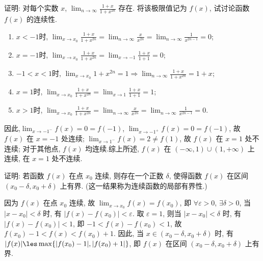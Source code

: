 \begin{exercise}[2.1.9]
    证明: 对每个实数 $x$, $\lim_{n \to \infty} \frac{1+x}{1+x^{2n}}$ 存在. 将该极限值记为 $f(x)$, 试讨论函数 $f(x)$ 的连续性.
\end{exercise}

\begin{solution}
    \begin{enumerate}[(\alph*).]
        \item $x < -1$时, $\lim_{x \to x_0} \frac{1+x}{1+x^{2n}} = \lim_{n \to \infty} \frac{x}{x^{2n}} = \lim_{n \to \infty} \frac{1}{x^{2n-1}} = 0$;
        \item $x = -1$时, $\lim_{x \to x_0} \frac{1+x}{1+x^{2n}} = \lim_{x \to -1} \frac{1+x}{1+1} = 0$;
        \item $-1 < x < 1$时, $\lim_{x \to x_0} 1 + x^{2n} = 1 \Rightarrow \lim_{n \to \infty} \frac{1+x}{1+x^{2n}} = 1 + x$;
        \item $x = 1$时, $\lim_{x \to x_0} \frac{1+x}{1+x^{2n}} = \lim_{x \to 1} \frac{1+x}{1+1} = 1$;
        \item $x > 1$时, $\lim_{x \to x_0} \frac{1+x}{1+x^{2n}} = \lim_{n \to \infty} \frac{x}{x^{2n}} = \lim_{n \to \infty} \frac{1}{x^{2n-1}} = 0$.
    \end{enumerate}
    因此,$\lim_{x \to -1^-} f(x) = 0 = f(-1)$, $\lim_{x \to -1^+} f(x) = 0 = f(-1)$, 故 $f(x)$ 在 $x=-1$ 处连续; $\lim_{x \to 1^-} f(x) = 2 \ne f(1)$, 故 $f(x)$ 在 $x=1$ 处不连续; 对于其他点, $f(x)$ 均连续.综上所述, $f(x)$ 在 $(-\infty, 1) \cup (1, +\infty)$ 上连续, 在 $x=1$ 处不连续.
\end{solution}

\begin{exercise}[2.1.10]
    证明: 若函数 $f(x)$ 在点 $x_0$ 连续, 则存在一个正数 $\delta$, 使得函数 $f(x)$ 在区间 $(x_0-\delta, x_0+\delta)$ 上有界. (这一结果称为连续函数的局部有界性.)
\end{exercise}

\begin{solution}
    因为 $f(x)$ 在点 $x_0$ 连续, 故 $\lim_{x \to x_0} f(x) = f(x_0)$, 即 $\forall \varepsilon > 0$, $\exists \delta > 0$, 当 $|x-x_0| < \delta$ 时, 有 $|f(x)-f(x_0)| < \varepsilon$. 取 $\varepsilon = 1$, 则当 $|x-x_0| < \delta$ 时, 有 $|f(x)-f(x_0)| < 1$, 即 $-1 < f(x)-f(x_0) < 1$, 故 $f(x_0)-1 < f(x) < f(x_0)+1$. 因此, 当 $x \in (x_0-\delta, x_0+\delta)$ 时, 有 $|f(x)| \les \max\{|f(x_0)-1|, |f(x_0)+1|\}$, 即 $f(x)$ 在区间 $(x_0-\delta, x_0+\delta)$ 上有界.
\end{solution}

